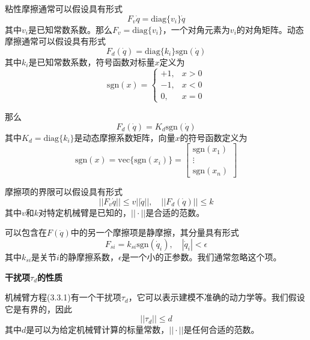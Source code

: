 \documentclass[12pt,a4paper]{ctexart}
\begin{document}
粘性摩擦通常可以假设具有形式
\begin{equation}
F_v\dot{q} = \text{diag}\{v_i\}\dot{q}
\end{equation}
其中$v_i$是已知常数系数。那么$F_v = \text{diag}\{v_i\}$，一个对角元素为$v_i$的对角矩阵。动态摩擦通常可以假设具有形式
\begin{equation}
F_d(\dot{q}) = \text{diag}\{k_i\}\text{sgn}(\dot{q})
\end{equation}
其中$k_i$是已知常数系数，符号函数对标量$x$定义为
\begin{equation}
\text{sgn}(x) = \begin{cases} +1, & x > 0 \\ -1, & x < 0 \\ 0, & x = 0 \end{cases}
\end{equation}

那么
\begin{equation}
F_d(\dot{q}) = K_d \text{sgn}(\dot{q})
\end{equation}
其中$K_d = \text{diag}\{k_i\}$是动态摩擦系数矩阵，向量$x$的符号函数定义为
\begin{equation}
\text{sgn}(x) = \text{vec}\{\text{sgn}(x_i)\} = \begin{bmatrix} \text{sgn}(x_1) \\ \vdots \\ \text{sgn}(x_n) \end{bmatrix}
\end{equation}

摩擦项的界限可以假设具有形式
\begin{equation}
||F_v\dot{q}|| \leq v||\dot{q}||, \quad ||F_d(\dot{q})|| \leq k
\end{equation}
其中$v$和$k$对特定机械臂是已知的，$||\cdot||$是合适的范数。

可以包含在$F(\dot{q})$中的另一个摩擦项是静摩擦，其分量具有形式
\begin{equation}
F_{si} = k_{si}\text{sgn}(\dot{q}_i), \quad |\dot{q}_i| < \epsilon
\end{equation}
其中$k_{si}$是关节$i$的静摩擦系数，$\epsilon$是一个小的正参数。我们通常忽略这个项。

\textbf{干扰项$\tau_d$的性质}

机械臂方程(3.3.1)有一个干扰项$\tau_d$，它可以表示建模不准确的动力学等。我们假设它是有界的，因此
\begin{equation}
||\tau_d|| \leq d
\end{equation}
其中$d$是可以为给定机械臂计算的标量常数，$||\cdot||$是任何合适的范数。
\end{document}
